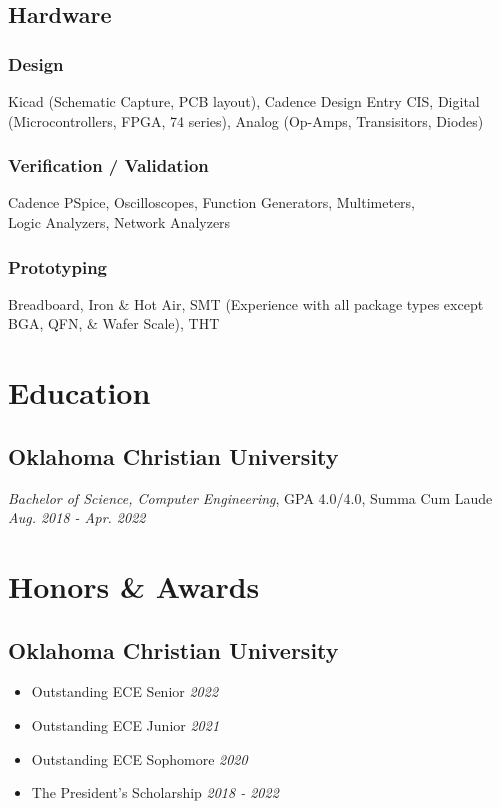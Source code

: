\documentclass{article}
\begin{document}
\begin{spacing}{.5}
	\subsection{Hardware}
		\subsubsection{Design} \large{ Kicad} \small{(Schematic Capture, PCB layout),} \large{Cadence Design Entry CIS, Digital} \small{(Microcontrollers, FPGA, 74 series),} \hspace*{.45cm}  \large{ Analog} \small{(Op-Amps, Transisitors, Diodes)}
		\subsubsection{Verification / Validation} \large{ Cadence PSpice, Oscilloscopes, Function Generators, Multimeters,\\ \hspace*{.45cm} Logic Analyzers, Network Analyzers}
		\subsubsection{Prototyping} \large{ Breadboard, Iron \& Hot Air, SMT} \small{(Experience with all package types except BGA, QFN, \& Wafer Scale),} \large{ \hspace*{.45cm} THT}

\section{Education}
	\subsection{Oklahoma Christian University}
		\hspace*{.35cm} \textit{Bachelor of Science, Computer Engineering}, GPA 4.0/4.0, Summa Cum Laude \hfill \small{\textsl{Aug. 2018 - Apr. 2022}}

\section{Honors \& Awards}
	\subsection{Oklahoma Christian University}
		\begin{itemize}[label=$\bullet$,itemsep=-.35ex]
			\item \large{Outstanding ECE Senior} \hfill \small{\textsl{2022}}
			\item \large{Outstanding ECE Junior} \hfill \small{\textsl{2021}}
			\item \large{Outstanding ECE Sophomore} \hfill \small{\textsl{2020}}
			\item \large{The President's Scholarship} \hfill \small{\textsl{2018 - 2022}}
		\end{itemize}

\end{spacing}
\end{document}
